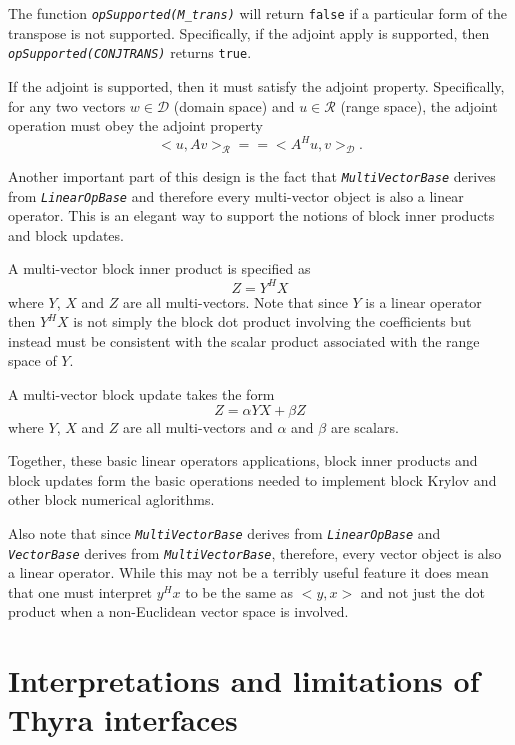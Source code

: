 \documentclass[11pt]{SANDreport}
\begin{document}
The function \texttt{\textit{opSupported(M\_trans)}} will return \texttt{false} if a particular form of the transpose is not supported.  Specifically, if the adjoint apply is supported, then \texttt{\textit{opSupported(CONJTRANS)}} returns \texttt{true}.

If the adjoint is supported, then it must satisfy the adjoint property. Specifically, for any two vectors $w\in\mathcal{D}$ (domain space) and $u\in\mathcal{R}$ (range space), the adjoint operation must obey the adjoint property
\[
  <u,A v>_{\mathcal{R}} =\!= <A^H u, v>_{\mathcal{D}}.
\]


Another important part of this design is the fact that \texttt{\textit{Multi\-Vector\-Base}} derives from \texttt{\textit{Linear\-Op\-Base}} and therefore every multi-vector object is also a linear operator.  This is an elegant way to support the notions of block inner products and block updates.

A multi-vector block inner product is specified as
\[
Z = Y^H X
\]
where $Y$, $X$ and $Z$ are all multi-vectors.  Note that since $Y$ is a linear operator then $Y^H X$ is not simply the block dot product involving the coefficients but instead must be consistent with the scalar product associated with the range space of $Y$.

A multi-vector block update takes the form
\[
Z =\alpha Y X + \beta Z
\]
where $Y$, $X$ and $Z$ are all multi-vectors and $\alpha$ and $\beta$ are scalars.

Together, these basic linear operators applications, block inner products and block updates form the basic operations needed to implement block Krylov and other block numerical aglorithms.

Also note that since \texttt{\textit{Multi\-Vector\-Base}} derives from \texttt{\textit{Linear\-Op\-Base}} and \texttt{\textit{Vector\-Base}} derives from \texttt{\textit{Multi\-Vector\-Base}}, therefore, every vector object is also a linear operator.  While this may not be a terribly useful feature it does mean that one must interpret $y^H x$ to be the same as $<y,x>$ and not just the dot product when a non-Euclidean vector space is involved.


%
\section{Interpretations and limitations of Thyra interfaces}
%
\end{document}
